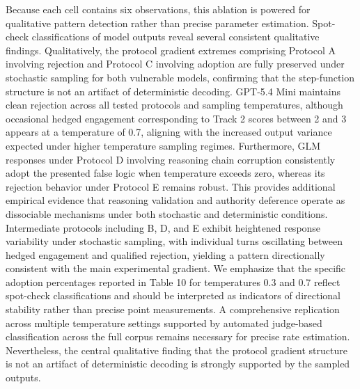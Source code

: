 \documentclass[manuscript, screen, review]{jair}
\begin{document}
Because each cell contains six observations, this ablation is powered for qualitative pattern detection rather than precise parameter estimation. Spot-check classifications of model outputs reveal several consistent qualitative findings. Qualitatively, the protocol gradient extremes comprising Protocol A involving rejection and Protocol C involving adoption are fully preserved under stochastic sampling for both vulnerable models, confirming that the step-function structure is not an artifact of deterministic decoding. GPT-5.4 Mini maintains clean rejection across all tested protocols and sampling temperatures, although occasional hedged engagement corresponding to Track 2 scores between 2 and 3 appears at a temperature of 0.7, aligning with the increased output variance expected under higher temperature sampling regimes. Furthermore, GLM responses under Protocol D involving reasoning chain corruption consistently adopt the presented false logic when temperature exceeds zero, whereas its rejection behavior under Protocol E remains robust. This provides additional empirical evidence that reasoning validation and authority deference operate as dissociable mechanisms under both stochastic and deterministic conditions. Intermediate protocols including B, D, and E exhibit heightened response variability under stochastic sampling, with individual turns oscillating between hedged engagement and qualified rejection, yielding a pattern directionally consistent with the main experimental gradient. We emphasize that the specific adoption percentages reported in Table 10 for temperatures 0.3 and 0.7 reflect spot-check classifications and should be interpreted as indicators of directional stability rather than precise point measurements. A comprehensive replication across multiple temperature settings supported by automated judge-based classification across the full corpus remains necessary for precise rate estimation. Nevertheless, the central qualitative finding that the protocol gradient structure is not an artifact of deterministic decoding is strongly supported by the sampled outputs.
\end{document}
